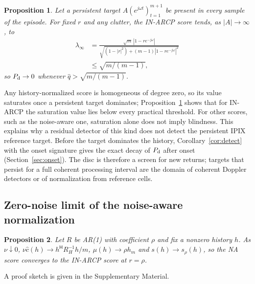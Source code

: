 \documentclass[journal]{IEEEtran}
\newtheorem{proposition}{Proposition}
\begin{document}
\begin{proposition}\label{prop:blind}
Let a persistent target $A(e^{j\omega t})_{t=1}^{m+1}$ be present in every sample of the episode. For fixed $r$ and any clutter, the IN-ARCP score tends, as $|A|\to\infty$, to
\begin{align*}
\lambda_\infty&=\frac{\sqrt m\,|1-re^{-j\omega}|}{\sqrt{(1-|r|^2)+(m-1)|1-re^{-j\omega}|^2}}\\
&\le\sqrt{m/(m-1)},
\end{align*}
so $P_{\rm d}\to0$ whenever $\widehat q>\sqrt{m/(m-1)}$.
\end{proposition}
Any history-normalized score is homogeneous of degree zero, so its value saturates once a persistent target dominates; Proposition~\ref{prop:blind} shows that for IN-ARCP the saturation value lies below every practical threshold. For other scores, such as the noise-aware one, saturation alone does not imply blindness. This explains why a residual detector of this kind does not detect the persistent IPIX reference target. Before the target dominates the history, Corollary~\ref{cor:detect} with the onset signature gives the exact decay of $P_{\rm d}$ after onset (Section~\ref{sec:onset}). The disc is therefore a screen for new returns; targets that persist for a full coherent processing interval are the domain of coherent Doppler detectors or of normalization from reference cells.

\subsection{Zero-noise limit of the noise-aware normalization}
\begin{proposition}\label{prop:reduce}
Let $R$ be AR(1) with coefficient $\rho$ and fix a nonzero history $h$. As $\nu\downarrow0$, $\nu\widehat c(h)\to h^{\mathsf H}R_H^{-1}h/m$, $\mu(h)\to\rho h_m$ and $s(h)\to s_\rho(h)$, so the NA score converges to the IN-ARCP score at $r=\rho$.
\end{proposition}
A proof sketch is given in the Supplementary Material.
\end{document}
